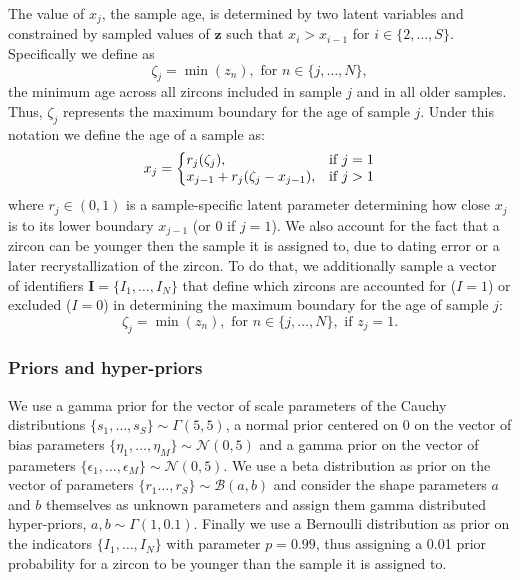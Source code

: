 \documentclass[12pt,letterpaper]{article}
\begin{document}
The value of $x_j$, the sample age, is determined by two latent variables and constrained by sampled values of $\mathbf{z}$ such that $x_{i} > x_{i - 1}$ for $i \in \{2, \dots, S\}$.
Specifically we define as 
\begin{equation}
\zeta_j = \min(z_{n}), \text{ for } n \in \{j, \dots, N\},
\end{equation}
the minimum age across all zircons included in sample $j$ and in all older samples. 
Thus, $\zeta_j$ represents the maximum boundary for the age of sample $j$.
Under this notation we define the age of a sample as: 
\begin{equation}
x_j = \left\{
\begin{array}{@{}ll@{}}
    r_j (\zeta_j), & \text{if}\ j = 1 \\
    x_{j - 1} + r_j (\zeta_j - x_{j - 1}), & \text{if}\ j > 1 \\
\end{array}\right.
\end{equation}
where $r_j \in (0, 1)$ is a sample-specific latent parameter determining how close $x_{j}$ is to its lower boundary $x_{j - 1}$ (or 0 if $j = 1$). 
%
We also account for the fact that a zircon can be younger then the sample it is assigned to, due to dating error or a later recrystallization of the zircon. 
To do that, we additionally sample a vector of identifiers $\mathbf{I} = \{I_1, \dots, I_N\}$ that define which zircons are accounted for ($I = 1$) or excluded ($I = 0$) in determining the maximum boundary for the age of sample $j$:
\begin{equation}
\zeta_j = \min(z_{n}), \text{ for } n \in \{j, \dots, N \}, \text{ if } z_j = 1.
\end{equation}

\subsubsection{Priors and hyper-priors}
We use a gamma prior for the vector of scale parameters of the Cauchy distributions $\{s_1, \dots, s_S \} \sim \Gamma(5, 5)$, a normal prior centered on 0 on the vector of bias parameters $\{\eta_1, \dots, \eta_M \} \sim \mathcal{N}(0, 5)$ and a gamma prior on the vector of parameters $\{\epsilon_1, \dots, \epsilon_M \} \sim \mathcal{N}(0, 5)$.
We use a beta distribution as prior on the vector of parameters $\{r_1 \dots, r_S\} \sim \mathcal{B}(a, b)$ and consider the shape parameters $a$ and $b$ themselves as unknown parameters and assign them gamma distributed hyper-priors, $a, b \sim \Gamma(1, 0.1)$.
Finally we use a Bernoulli distribution as prior on the indicators $\{I_1, \dots, I_N\}$ with parameter $p = 0.99$, thus assigning a 0.01 prior probability for a zircon to be younger than the sample it is assigned to. 
\end{document}

